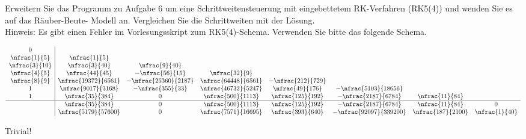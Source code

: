 \begin{exercise}
  Erweitern Sie das Programm zu Aufgabe $6$ um eine Schrittweitensteuerung mit
  eingebettetem RK-Verfahren (RK5(4)) und wenden Sie es auf das Räuber-Beute-
  Modell an. Vergleichen Sie die Schrittweiten mit der Lösung. \\

  Hinweis: Es gibt einen Fehler im Vorlesungsskript zum RK5(4)-Schema. Verwenden
  Sie bitte das folgende Schema.

  \begin{align*}
    \begin{array}{c|ccccccc}
    0 & & & & & & &                                                         \\
    \nfrac{1}{5} & \nfrac{1}{5} & & & & & &                                 \\
    \nfrac{3}{10} & \nfrac{3}{40} & \nfrac{9}{40} & & & & &                 \\
    \nfrac{4}{5} & \nfrac{44}{45} & -\nfrac{56}{15} & \nfrac{32}{9} & & & & \\
    \nfrac{8}{9} & \nfrac{19372}{6561} & -\nfrac{25360}{2187} &
    \nfrac{64448}{6561} & -\nfrac{212}{729} & & &                           \\
    1 & \nfrac{9017}{3168} & -\nfrac{355}{33} & \nfrac{46732}{5247} &
    \nfrac{49}{176} & -\nfrac{5103}{18656} & &                              \\
    1 & \nfrac{35}{384} & 0 & \nfrac{500}{1113} & \nfrac{125}{192} &
    -\nfrac{2187}{6784} & \nfrac{11}{84} &                                  \\
    \hline
     & \nfrac{35}{384} & 0 & \nfrac{500}{1113} & \nfrac{125}{192} &
    -\nfrac{2187}{6784} & \nfrac{11}{84} & 0                                \\
     & \nfrac{5179}{57600} & 0 & \nfrac{7571}{16695} & \nfrac{393}{640} &
     -\nfrac{92097}{339200} & \nfrac{187}{2100} & \nfrac{1}{40}
    \end{array}
  \end{align*}

\end{exercise}

\begin{solution}
  Trivial!
\end{solution}
